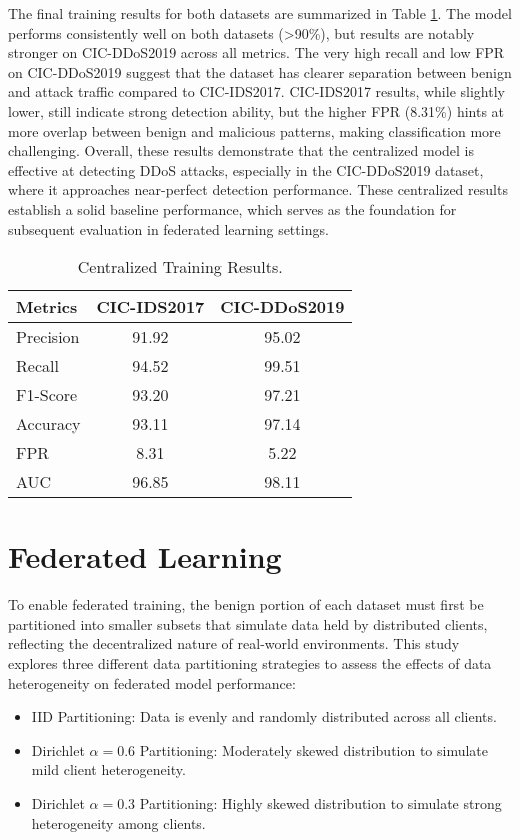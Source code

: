 The final training results for both datasets are summarized in Table \ref{tbl:central_train_results}. The model performs consistently well on both datasets (>90\%), but results are notably stronger on CIC-DDoS2019 across all metrics. The very high recall and low FPR on CIC-DDoS2019 suggest that the dataset has clearer separation between benign and attack traffic compared to CIC-IDS2017. CIC-IDS2017 results, while slightly lower, still indicate strong detection ability, but the higher FPR (8.31\%) hints at more overlap between benign and malicious patterns, making classification more challenging. Overall, these results demonstrate that the centralized model is effective at detecting DDoS attacks, especially in the CIC-DDoS2019 dataset, where it approaches near-perfect detection performance. These centralized results establish a solid baseline performance, which serves as the foundation for subsequent evaluation in federated learning settings.

\begin{table}[h]
    \caption{Centralized Training Results.}
    \centering
    \begin{tabular}{l|c|c}
        Metrics & CIC-IDS2017 & CIC-DDoS2019 \\
        \hline\hline
        Precision & 91.92 & 95.02 \\
        Recall & 94.52 & 99.51 \\
        F1-Score & 93.20 & 97.21 \\
        Accuracy & 93.11 & 97.14 \\
        FPR & 8.31 & 5.22 \\
        AUC & 96.85 & 98.11 \\
    \end{tabular}
    \label{tbl:central_train_results}
\end{table}

\section{Federated Learning}

To enable federated training, the benign portion of each dataset must first be partitioned into smaller subsets that simulate data held by distributed clients, reflecting the decentralized nature of real-world environments. This study explores three different data partitioning strategies to assess the effects of data heterogeneity on federated model performance:

\begin{itemize}
    \item IID Partitioning: Data is evenly and randomly distributed across all clients.
    \item Dirichlet $\alpha=0.6$ Partitioning: Moderately skewed distribution to simulate mild client heterogeneity.
    \item Dirichlet $\alpha=0.3$ Partitioning: Highly skewed distribution to simulate strong heterogeneity among clients.
\end{itemize}

